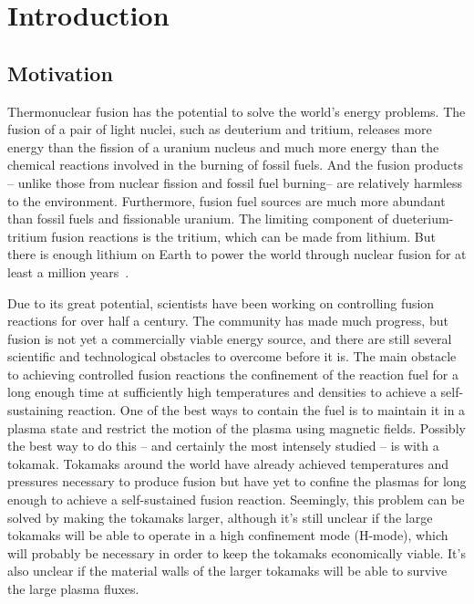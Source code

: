 \chapter{Introduction}
\label{c_intro}

\section{Motivation}
\label{s_motivation}

Thermonuclear fusion has the potential to solve the world's energy problems. The fusion of a pair of light nuclei, such as deuterium and tritium, releases more energy than the fission
of a uranium nucleus and much more energy than the chemical reactions involved in the burning of fossil fuels. And the fusion products 
-- unlike those from nuclear fission and fossil fuel burning-- are relatively harmless to the environment. Furthermore, fusion fuel sources are much more abundant than fossil fuels
and fissionable uranium. The limiting component of dueterium-tritium fusion reactions is the tritium, which can be made from lithium. But there is enough lithium on Earth to power the world
through nuclear fusion for at least a million years~\cite{wesson2004}.

Due to its great potential, scientists have been working on controlling fusion reactions for over half a century. The community has made much progress, but fusion is not yet a commercially
viable energy source, and there are still several scientific and technological obstacles to overcome before it is. The main obstacle to achieving controlled fusion reactions the confinement of the
reaction fuel for a long enough time at sufficiently high temperatures and densities to achieve a self-sustaining reaction. 
One of the best ways to contain the fuel is to maintain it in a plasma state and restrict the motion of the plasma using magnetic fields. 
Possibly the best way to do this -- and certainly the most intensely studied -- is with a tokamak. Tokamaks around the world have already achieved temperatures and pressures
necessary to produce fusion but have yet to confine the plasmas for long enough to achieve a self-sustained fusion reaction. Seemingly, this problem can be solved by making
the tokamaks larger, although it's still unclear if the large tokamaks will be able to operate in a high confinement mode (H-mode), which will probably be necessary in order to
keep the tokamaks economically viable. It's also unclear if the material walls of the larger tokamaks will be able to survive the large plasma fluxes.


